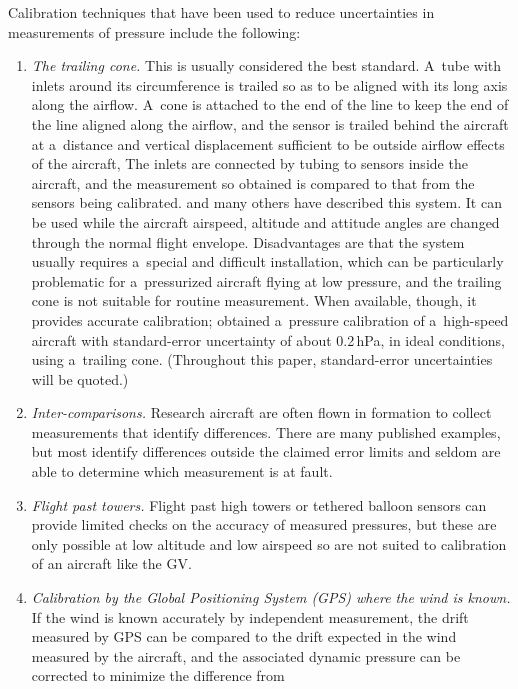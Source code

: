 \documentclass[amtd, online, hvmath]{copernicus}
\begin{document}
Calibration techniques that have been used to reduce uncertainties in
measurements of pressure include the following:
\begin{enumerate}
\item \textit{The trailing cone.} This is usually considered the best
  standard.  A~tube with inlets around its circumference is trailed so
  as to be aligned with its long axis along the airflow. A~cone is
  attached to the end of the line to keep the end of the line aligned
  along the airflow, and the sensor is trailed behind the aircraft at
  a~distance and vertical displacement sufficient to be outside
  airflow effects of the aircraft, The inlets are connected by tubing
  to sensors inside the aircraft, and the measurement so obtained is
  compared to that from the sensors being
  calibrated. \citet{IkhtiariMarth1964} and many others have described
  this system. It can be used while the aircraft airspeed, altitude
  and attitude angles are changed through the normal flight
  envelope. Disadvantages are that the system usually requires
  a~special and difficult installation, which can be particularly
  problematic for a~pressurized aircraft flying at low pressure, and
  the trailing cone is not suitable for routine measurement. When
  available, though, it provides accurate calibration;
  \citet{BrownTN1988} obtained a~pressure calibration of a~high-speed
  aircraft with standard-error uncertainty of about 0.2\,\unit{hPa},
  in ideal conditions, using a~trailing cone. (Throughout this paper,
  standard-error uncertainties will be quoted.)
\item \textit{Inter-comparisons.} Research aircraft are often flown in
  formation to collect measurements that identify differences. There
  are many published examples, but most identify differences outside
  the claimed error limits and seldom are able to determine which
  measurement is at fault.
\item \textit{Flight past towers.} Flight past high towers or tethered
  balloon sensors can provide limited checks on the accuracy of
  measured pressures, but these are only possible at low altitude and
  low airspeed so are not suited to calibration of an aircraft like
  the GV.
\item \textit{Calibration by the Global Positioning System (GPS) where
    the wind is known.} If the wind is known accurately by independent
  measurement, the drift measured by GPS can be compared to the drift
  expected in the wind measured by the aircraft, and the associated
  dynamic pressure can be corrected to minimize the difference from

\end{enumerate}
\end{document}
